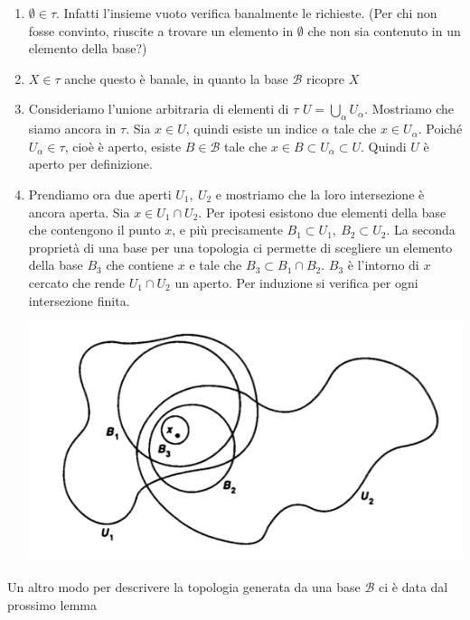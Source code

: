 \documentclass[10pt,a4paper]{article}
\theoremstyle{definition}
\theoremstyle{plain}
\theoremstyle{remark}
\theoremstyle{remark}
\newcommand{\B}{\mathcal{B}}
\begin{document}
\begin{enumerate}
\item $\emptyset \in \tau$. Infatti l'insieme vuoto verifica banalmente le
richieste. (Per chi non fosse convinto, riuscite a trovare un elemento in
$\emptyset$ che non sia contenuto in un elemento della base?)
\item $X \in \tau$ anche questo è banale, in quanto la base $\B$ ricopre $X$
\item Consideriamo l'unione arbitraria di elementi di $\tau$ $U=
\bigcup_{\alpha}U_{\alpha}$. Mostriamo che siamo ancora in $\tau$. Sia $x \in
U$, quindi esiste un indice $\alpha$ tale che $x \in U_{\alpha}$. Poiché
$U_{\alpha} \in \tau$, cioè è aperto, esiste $B \in \B$ tale che $x \in B
\subset U_{\alpha} \subset U$. Quindi $U$ è aperto per definizione.
\item Prendiamo ora due aperti $U_1, \ U_2$ e mostriamo che la loro intersezione
è ancora aperta. Sia $x \in U_1 \cap U_2$. Per ipotesi esistono due elementi
della base che contengono il punto $x$, e più precisamente $B_1 \subset U_1, \
B_2 \subset U_2$. La seconda proprietà di una base per una topologia ci permette
di scegliere un elemento della base $B_3$ che contiene $x$ e tale che $B_3
\subset B_1 \cap B_2$. $B_3$ è l'intorno di $x$ cercato che rende $U_1 \cap U_2$
un aperto.  Per induzione si verifica per ogni intersezione finita.



\begin{center}
\includegraphics[scale=0.5]{intbase.png}
\end{center}

\end{enumerate}



Un altro modo per descrivere la topologia generata da una base $\B$ ci è data
dal prossimo lemma
\end{document}
